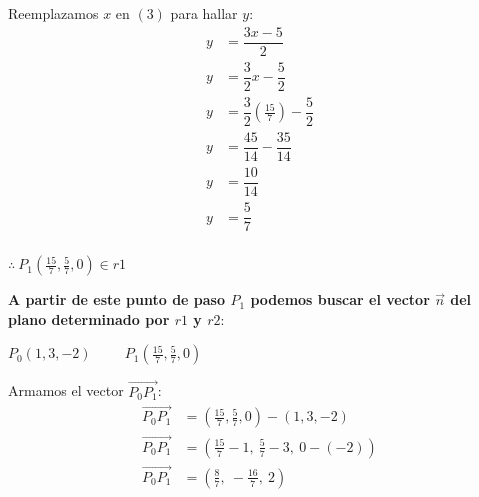 \begin{multicols}{2}
	Reemplazamos $x$ en $(3)$ para hallar $y$:
	\begin{align*}
		y & = \dfrac{3x - 5}{2}                                      \\
		y & = \dfrac{3}{2}x - \dfrac{5}{2}                           \\
		y & = \dfrac{3}{2} \left(\frac{15}{7} \right) - \dfrac{5}{2} \\
		y & = \dfrac{45}{14} - \dfrac{35}{14}                        \\
		y & = \dfrac{10}{14}                                         \\
		y & = \boxed{\dfrac{5}{7}}                                   \\
	\end{align*}

	$\therefore \ \boxed{P_1 \left (\frac{15}{7}, \frac{5}{7}, 0 \right) \in r1}$
\end{multicols}

\vspace{6cm}
\noindent \textbf{A partir de este punto de paso $P_1$ podemos buscar el vector $\vec{n}$ del plano determinado por $r1$ y $r2$}:

\begin{center}
	$P_0(1, 3, -2) \hspace{1cm} P_1 \left (\frac{15}{7}, \frac{5}{7}, 0 \right)$
\end{center}

\noindent Armamos el vector $\overrightarrow{P_0P_1}$:
\begin{align*}
	\overrightarrow{P_0P_1} & = \left (\frac{15}{7}, \frac{5}{7}, 0 \right) - (1, 3, -2)       \\
	\overrightarrow{P_0P_1} & = \left (\frac{15}{7} - 1, \ \frac{5}{7} - 3, \ 0 - (-2) \right) \\
	\overrightarrow{P_0P_1} & = \left (\frac{8}{7}, \ -\frac{16}{7}, \ 2 \right)               \\
\end{align*}


